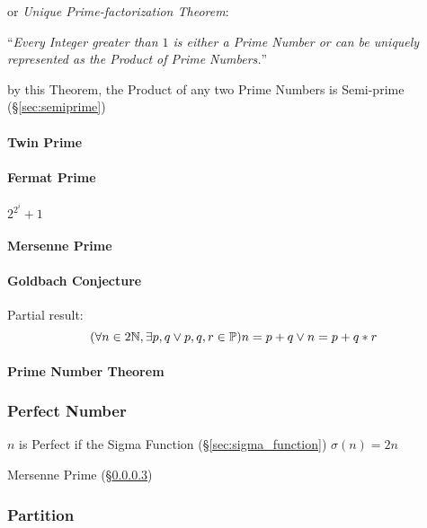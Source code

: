 or \emph{Unique Prime-factorization Theorem}:

``\emph{Every Integer greater than $1$ is either a Prime Number or can be
  uniquely represented as the Product of Prime Numbers.}''

by this Theorem, the Product of any two Prime Numbers is Semi-prime
(\S\ref{sec:semiprime})



\paragraph{Twin Prime}\label{sec:twin_prime}\hfill

\paragraph{Fermat Prime}\label{sec:fermat_prime}\hfill

$2^{2^i} + 1$



\paragraph{Mersenne Prime}\label{sec:mersenne_prime}\hfill

\paragraph{Goldbach Conjecture}\label{sec:goldbach_conjecture}\hfill

Partial result:
\[
  (\forall n \in 2\mathbb{N}, \exists p,q \vee p,q,r \in \mathbb{P})
  n = p + q \vee n = p + q * r
\]



\paragraph{Prime Number Theorem}\label{sec:prime_number_theorem}\hfill



\subsubsection{Perfect Number}\label{sec:perfect_number}

$n$ is Perfect if the Sigma Function (\S\ref{sec:sigma_function})
$\sigma(n) = 2n$

Mersenne Prime (\S\ref{sec:mersenne_prime})



\subsubsection{Partition}\label{sec:integer_partition}

